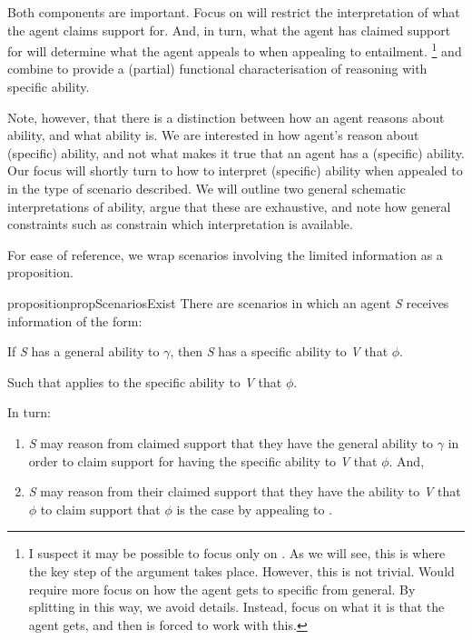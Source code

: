 \begin{note}
  Both components are important.
  Focus on \gsi{} will restrict the interpretation of what the agent claims support for.
  And, in turn, what the agent has claimed support for will determine what the agent appeals to when appealing to  entailment.\nolinebreak
  \footnote{
    I suspect it may be possible to focus only on \gsi{}.
    As we will see, this is where the key step of the argument takes place.
    However, this is not trivial.
    Would require more focus on how the agent gets to specific from general.
    By splitting in this way, we avoid details.
    Instead, focus on what it is that the agent gets, and then  is forced to work with this.
  }
  \gsi{} and  combine to provide a (partial) functional characterisation of reasoning with specific ability.
\end{note}

\begin{note}
  Note, however, that there is a distinction between how an agent reasons about ability, and what ability is.
  We are interested in how agent's reason about (specific) ability, and not what makes it true that an agent has a (specific) ability.
  Our focus will shortly turn to how to interpret (specific) ability when appealed to in the type of scenario described.
  We will outline two general schematic interpretations of ability, argue that these are exhaustive, and note how general constraints such as \ESU{} constrain which interpretation is available.
\end{note}

\begin{note}
  For ease of reference, we wrap scenarios involving the limited information as a proposition.
    \begin{restatable}[\eA{-} --- \eA{}]{proposition}{propScenariosExist}\label{prop:SE}
    There are scenarios in which an agent \emph{S} receives \gsi{} information of the form:
    \begin{center}
      If \emph{S} has a general ability to \(\gamma\), then \emph{S} has a specific ability to \emph{V} that \(\phi\).
    \end{center}

    \noindent Such that  applies to the specific ability to \emph{V} that \(\phi\).

    In turn:
    \begin{enumerate}
    \item \emph{S} may reason from claimed support that they have the general ability to \(\gamma\) in order to claim support for having the specific ability to \emph{V} that \(\phi\). And,
    \item \emph{S} may reason from their claimed support that they have the ability to \emph{V} that \(\phi\) to claim support that \(\phi\) is the case by appealing to .
    \end{enumerate}
    \vspace{-\baselineskip}
  \end{restatable}
\end{note}

